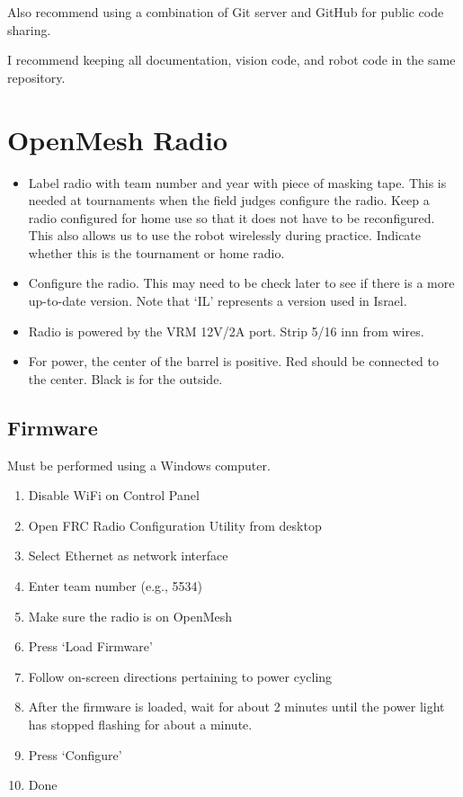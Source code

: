 Also recommend using a combination of Git server and GitHub for public code sharing.

I recommend keeping all documentation, vision code, and robot code in the same repository.



\newpage\section*{OpenMesh Radio}

\begin{itemize}
\item Label radio with team number and year with piece of masking tape. This is needed at tournaments when the field judges configure the radio. Keep a radio configured for home use so that it does not have to be reconfigured. This also allows us to use the robot wirelessly during practice. Indicate whether this is the tournament or home radio.

\item Configure the radio. This may need to be check later to see if there is a more up-to-date version. Note that `IL' represents a version used in Israel.

\item Radio is powered by the VRM 12V/2A port. Strip 5/16 inn from wires.

\item For power, the center of the barrel is positive. Red should be connected to the center. Black is for the outside.
\end{itemize}


\subsection*{Firmware}

Must be performed using a Windows computer.

\begin{enumerate}
\item Disable WiFi on Control Panel

\item Open FRC Radio Configuration Utility from desktop

\item Select Ethernet as network interface

\item Enter team number (e.g., 5534)

\item Make sure the radio is on OpenMesh

\item Press `Load Firmware'

\item Follow on-screen directions pertaining to power cycling

\item After the firmware is loaded, wait for about 2 minutes until the power light has stopped flashing for about a minute.

\item Press `Configure'

\item Done
\end{enumerate}

